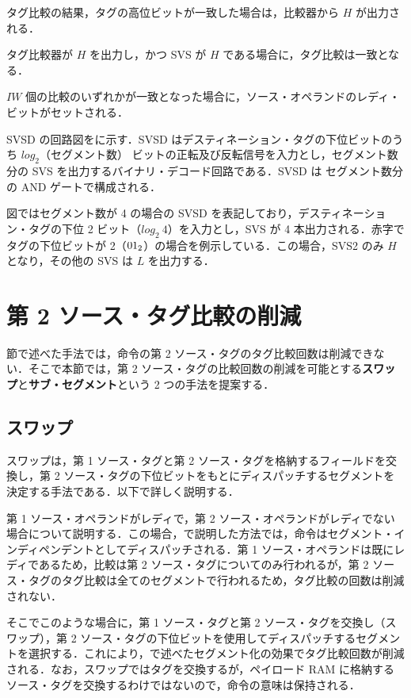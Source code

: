 タグ比較の結果，タグの高位ビットが一致した場合は，比較器から $H$ が出力される．

タグ比較器が $H$ を出力し，かつ SVS が $H$ である場合に，タグ比較は一致となる．

$IW$ 個の比較のいずれかが一致となった場合に，ソース・オペランドのレディ・ビットがセットされる．

SVSD の回路図をに示す．SVSD はデスティネーション・タグの下位ビットのうち $log_2（セグメント数）$ ビットの正転及び反転信号を入力とし，セグメント数分の SVS を出力するバイナリ・デコード回路である．SVSD は セグメント数分の AND ゲートで構成される．

図ではセグメント数が 4 の場合の SVSD を表記しており，デスティネーション・タグの下位 2 ビット（$log_2\:4$）を入力とし，SVS が 4 本出力される．赤字でタグの下位ビットが 2（${\rm 01_2}$）の場合を例示している．この場合，SVS2 のみ $H$ となり，その他の SVS は $L$ を出力する． 

\section{第 2 ソース・タグ比較の削減}
\label{sec:second_tag_comp}
節で述べた手法では，命令の第 2 ソース・タグのタグ比較回数は削減できない．そこで本節では，第 2 ソース・タグの比較回数の削減を可能とする\textbf{スワップ}と\textbf{サブ・セグメント}という 2 つの手法を提案する．

\subsection{スワップ}
\label{sec:swap}
スワップは，第 1 ソース・タグと第 2 ソース・タグを格納するフィールドを交換し，第 2 ソース・タグの下位ビットをもとにディスパッチするセグメントを決定する手法である．以下で詳しく説明する．

第 1 ソース・オペランドがレディで，第 2 ソース・オペランドがレディでない場合について説明する．この場合，で説明した方法では，命令はセグメント・インディペンデントとしてディスパッチされる．第 1 ソース・オペランドは既にレディであるため，比較は第 2 ソース・タグについてのみ行われるが，第 2  ソース・タグのタグ比較は全てのセグメントで行われるため，タグ比較の回数は削減されない．

そこでこのような場合に，第 1 ソース・タグと第 2 ソース・タグを交換し（スワップ），第 2 ソース・タグの下位ビットを使用してディスパッチするセグメントを選択する．これにより，で述べたセグメント化の効果でタグ比較回数が削減される．なお，スワップではタグを交換するが，ペイロード RAM に格納するソース・タグを交換するわけではないので，命令の意味は保持される．

